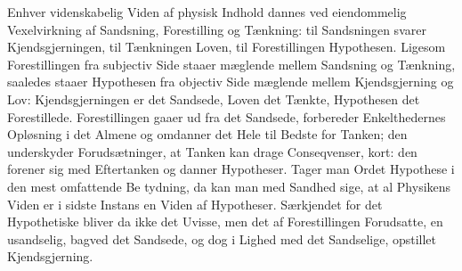 \documentclass[12pt,a4paper]{book}
\begin{document}
Enhver videnskabelig Viden af physisk Indhold dannes ved eiendommelig
Vexelvirkning af Sandsning, Forestilling og Tænkning: til Sandsningen
svarer Kjendsgjerningen, til Tænkningen Loven, til Forestillingen
Hypothesen. Ligesom Forestillingen fra subjectiv Side staaer mæglende
mellem Sandsning og Tænkning, saaledes staaer Hypothesen fra objectiv Side
mæglende mellem Kjendsgjerning og Lov: Kjendsgjerningen er det Sandsede,
Loven det Tænkte, Hypothesen det Forestillede. Forestillingen gaaer ud fra
det Sandsede, forbereder Enkelthedernes Opløsning i det Almene og omdanner
det Hele til Bedste for Tanken; den underskyder Forudsætninger, at Tanken
kan drage Conseqvenser, kort: den forener sig med Eftertanken og danner
Hypotheser. Tager man Ordet Hypothese i den mest omfattende Be\-%
tydning, da kan man med Sandhed sige, at al Physikens Viden er i sidste
Instans en Viden af Hypotheser. Særkjendet for det Hypothetiske bliver da
ikke det Uvisse, men det af Forestillingen Forudsatte, en usandselig,
bagved det Sandsede, og dog i Lighed med det Sandselige, opstillet
Kjendsgjerning.
\end{document}
